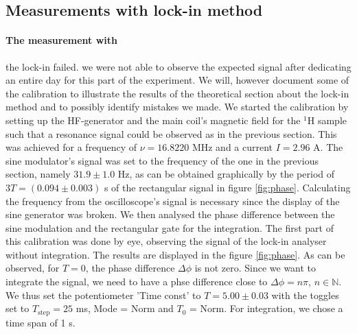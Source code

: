 \subsection{Measurements with lock-in method}
\paragraph{The measurement with}
the lock-in failed. we were not able to observe the expected signal 
after dedicating an entire day for this part of the experiment. We will, however document some 
of the calibration to illustrate the results of the theoretical section about the lock-in method 
and to possibly identify mistakes we made. 
We started the calibration by setting up the HF-generator and the main coil's magnetic field 
for the $^1$H sample such that a resonance signal could be observed as in the previous section.
This was achieved for a frequency of $\nu = 16.8220$ MHz and a current $I = 2.96$ A. 
The sine modulator's signal was set to the frequency of the one in the previous section, 
namely $31.9 \pm 1.0$ Hz, as can be obtained graphically by the period of $3T = (0.094 \pm 0.003)$ s 
of the rectangular signal in figure \ref{fig:phase}. Calculating the frequency from the 
oscilloscope's signal is necessary since the display of the sine generator was broken. 
We then analysed the phase difference between the sine modulation and the rectangular gate 
for the integration. The first part of this calibration was done by eye, observing the 
signal of the lock-in analyser without integration. The results are displayed in the figure
\ref{fig:phase}. As can be observed, for $T = 0$, the phase difference $\Delta \phi$ is not zero. 
Since we want to integrate the signal, we need to have a phse difference close to $\Delta \phi = n \pi$, 
$n \in \mathbb{N}$. We thus set the potentiometer 'Time const' to $T = 5.00 \pm 0.03$ with the 
toggles set to $T_\mathrm{step} = 25$ ms, Mode = Norm and $T_0$ = Norm. For integration, we 
chose a time span of 1 s. 


